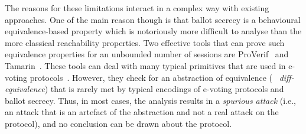 The reasons for these limitations interact in a complex way
with existing approaches. One of the main reason though
is that ballot secrecy is a behavioural equivalence-based property which is
notoriously more difficult to analyse than the more classical reachability properties.
%
Two effective tools that can prove such equivalence properties for an unbounded number of sessions
are ProVerif~\cite{BlanchetCSFW01} and Tamarin~\cite{Tamarin}.
These tools can deal with many typical primitives that are used in e-voting protocols~\cite{vote-CSF08-maffei,vote-CSF16,dreier2017beyond,basin2018alethea}.
However, they check for an abstraction of equivalence (\ie~{\em
diff-equivalence}) that is rarely met by typical encodings of e-voting
protocols and ballot secrecy.  Thus, in most cases, the analysis
results in a \emph{spurious attack} (i.e., an attack that is an
artefact of the abstraction and not a real attack on the protocol), and
no conclusion can be drawn about the protocol.

